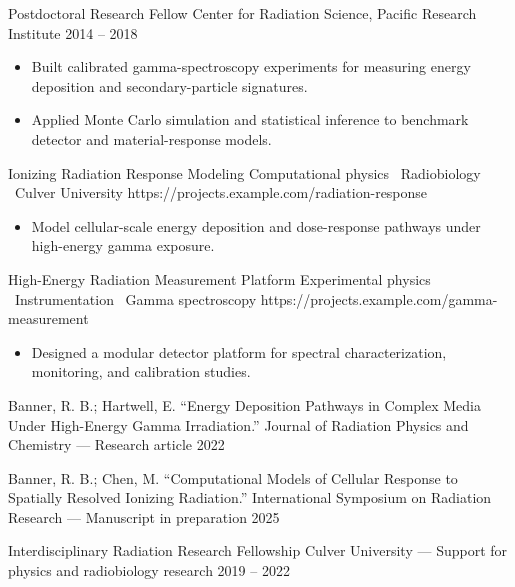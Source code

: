 \resumeentry
    {Postdoctoral Research Fellow}
    {Center for Radiation Science, Pacific Research Institute}
    {2014 -- 2018}
\begin{itemize}
    \item Built calibrated gamma-spectroscopy experiments for measuring energy deposition and secondary-particle signatures.
    \item Applied Monte Carlo simulation and statistical inference to benchmark detector and material-response models.
\end{itemize}

\resumesection{\researchprojectstitle}

\resumeproject
    {Ionizing Radiation Response Modeling}
    {Computational physics \textbar\ Radiobiology \textbar\ Culver University}
    {https://projects.example.com/radiation-response}
\begin{itemize}
    \item Model cellular-scale energy deposition and dose-response pathways under high-energy gamma exposure.
\end{itemize}

\resumeproject
    {High-Energy Radiation Measurement Platform}
    {Experimental physics \textbar\ Instrumentation \textbar\ Gamma spectroscopy}
    {https://projects.example.com/gamma-measurement}
\begin{itemize}
    \item Designed a modular detector platform for spectral characterization, monitoring, and calibration studies.
\end{itemize}

\resumesection{\academicoutputtitle}

\resumeentry
    {Banner, R. B.; Hartwell, E. ``Energy Deposition Pathways in Complex Media Under High-Energy Gamma Irradiation.''}
    {Journal of Radiation Physics and Chemistry --- Research article}
    {2022}

\resumeentry
    {Banner, R. B.; Chen, M. ``Computational Models of Cellular Response to Spatially Resolved Ionizing Radiation.''}
    {International Symposium on Radiation Research --- Manuscript in preparation}
    {2025}

\resumesection{\scholarshipsawardstitle}

\resumeentry
    {Interdisciplinary Radiation Research Fellowship}
    {Culver University --- Support for physics and radiobiology research}
    {2019 -- 2022}

